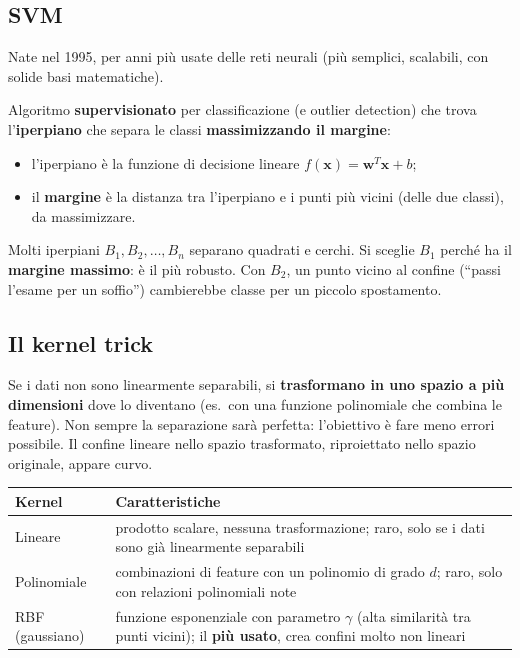 \subsection{SVM}
Nate nel 1995, per anni più usate delle reti neurali (più semplici, scalabili, con solide basi matematiche).
\begin{definizione}[SVM]
Algoritmo \textbf{supervisionato} per classificazione (e outlier detection) che trova l'\textbf{iperpiano} che separa le classi
\textbf{massimizzando il margine}:
\begin{itemize}
  \item l'iperpiano è la funzione di decisione lineare $f(\mathbf{x}) = \mathbf{w}^T\mathbf{x} + b$;
  \item il \textbf{margine} è la distanza tra l'iperpiano e i punti più vicini (delle due classi), da massimizzare.
\end{itemize}
\end{definizione}
\begin{esempio}
Molti iperpiani $B_1, B_2, \ldots, B_n$ separano quadrati e cerchi. Si sceglie $B_1$ perché ha il \textbf{margine massimo}: è il più robusto.
Con $B_2$, un punto vicino al confine (``passi l'esame per un soffio'') cambierebbe classe per un piccolo spostamento.
\end{esempio}

\subsection{Il kernel trick}
Se i dati non sono linearmente separabili, si \textbf{trasformano in uno spazio a più dimensioni} dove lo diventano (es.\ con una funzione
polinomiale che combina le feature). Non sempre la separazione sarà perfetta: l'obiettivo è fare meno errori possibile. Il confine lineare
nello spazio trasformato, riproiettato nello spazio originale, appare curvo.
\begin{center}
\small
\begin{tabularx}{\textwidth}{l X}
\toprule
\textbf{Kernel} & \textbf{Caratteristiche}\\
\midrule
Lineare & prodotto scalare, nessuna trasformazione; raro, solo se i dati sono già linearmente separabili\\
Polinomiale & combinazioni di feature con un polinomio di grado $d$; raro, solo con relazioni polinomiali note\\
RBF (gaussiano) & funzione esponenziale con parametro $\gamma$ (alta similarità tra punti vicini); il \textbf{più usato}, crea confini molto non lineari\\
\bottomrule
\end{tabularx}
\end{center}

